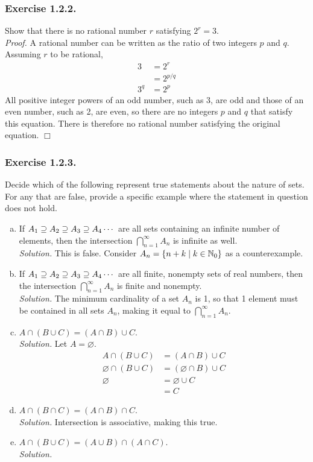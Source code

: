 \documentclass[../Exercises.tex]{subfiles}
\begin{document}
		\subsubsection{Exercise 1.2.2.}
			Show that there is no rational number $r$ satisfying $2^r = 3$. \\
			\emph{Proof.}
				A rational number can be written as the ratio of two integers $p$ and $q$. Assuming $r$ to be rational, 
					\begin{align*}
						3 &= 2^r \\
							&= 2^{p/q} \\
						3^q &= 2^p
					\end{align*}
					All positive integer powers of an odd number, such as 3, are odd and those of an even number, such as 2, are even, so there are no integers $p$ and $q$ that satisfy this equation. There is therefore no rational number satisfying the original equation. $\Box$
		\subsubsection*{Exercise 1.2.3.}
			Decide which of the following represent true statements about the nature of sets. For any that are false, provide a specific example where the statement in question does not hold.
			\begin{enumerate}[(a)]
				\item
					If $A_1 \supseteq A_2 \supseteq A_3 \supseteq A_4 \cdots$ are all sets containing an infinite number of elements, then the intersection $\bigcap\limits_{n = 1}^\infty A_n$ is infinite as well. \\
					\emph{Solution.} 
						This is false. Consider $A_n = \{n + k \mid k \in \mathbb{N}_0\}$ as a counterexample.
				\item
					If $A_1 \supseteq A_2 \supseteq A_3 \supseteq A_4 \cdots$ are all finite, nonempty sets of real numbers, then the intersection $\bigcap\limits_{n = 1}^\infty A_n$ is finite and nonempty. \\
					\emph{Solution.} 
						The minimum cardinality of a set $A_n$ is 1, so that 1 element must be contained in all sets $A_n$, making it equal to 
							$\bigcap\limits_{n = 1}^\infty A_n$.
				\item
					$A \cap (B \cup C) = (A \cap B) \cup C$. \\
					\emph{Solution.} 
						Let $A = \varnothing$.
							\begin{align*}
								A \cap (B \cup C) &= (A \cap B) \cup C \\
								\varnothing \cap (B \cup C) &= (\varnothing \cap B) \cup C \\
								\varnothing &= \varnothing \cup C \\
									&= C
							\end{align*}
				\item
					$A \cap (B \cap C) = (A \cap B) \cap C$. \\
					\emph{Solution.} 
						Intersection is associative, making this true.
				\item
					$A \cap (B \cup C) = (A \cup B) \cap (A \cap C)$. \\
					\emph{Solution.}
			\end{enumerate}
\end{document}
